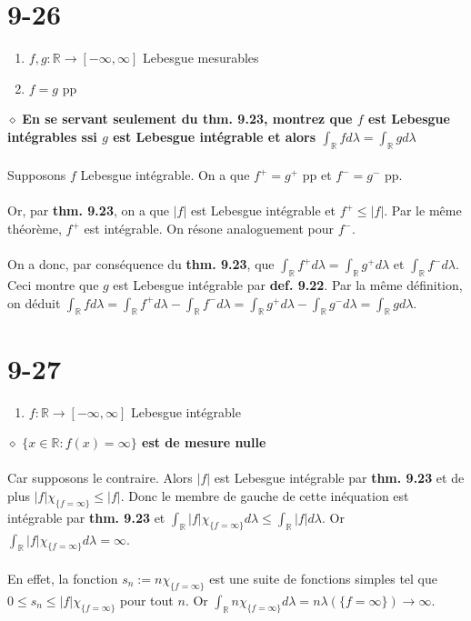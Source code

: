 \documentclass[a4paper,10pt]{article}
\begin{document}
\section*{9-26}
\begin{enumerate}
	\item $f,g : \mathbb{R} \rightarrow [-\infty, \infty]$ Lebesgue mesurables
	\item $f = g$ pp
\end{enumerate}
$\diamond$ \textbf{En se servant seulement du thm. 9.23, montrez que $f$ est Lebesgue intégrables ssi $g$ est Lebesgue intégrable et alors $\int_\mathbb{R} f d\lambda = \int_\mathbb{R} g d\lambda$}
\\
\\
Supposons $f$ Lebesgue intégrable. On a que $f^+ = g^+$ pp et $f^- = g^-$ pp.
\\
\\
Or, par \textbf{thm. 9.23}, on a que $|f|$ est Lebesgue intégrable et $f^+ \leq |f|$. Par le même théorème, $f^+$ est intégrable. On résone analoguement pour $f^-$.
\\
\\
On a donc, par conséquence du \textbf{thm. 9.23}, que $\int_\mathbb{R} f^+ d\lambda = \int_\mathbb{R} g^+ d\lambda$ et $\int_\mathbb{R} f^- d\lambda$. Ceci montre que $g$ est Lebesgue intégrable par \textbf{def. 9.22}. Par la même définition, on déduit $\int_\mathbb{R} f d\lambda = \int_\mathbb{R} f^+ d\lambda - \int_\mathbb{R} f^- d\lambda = \int_\mathbb{R} g^+ d\lambda - \int_\mathbb{R} g^- d\lambda = \int_\mathbb{R} g d\lambda$.

\section*{9-27}
\begin{enumerate}
	\item $f : \mathbb{R} \rightarrow [-\infty, \infty]$ Lebesgue intégrable
\end{enumerate}
$\diamond$ \textbf{$\{x \in \mathbb{R} : f(x) = \infty\}$ est de mesure nulle}
\\
\\
Car supposons le contraire. Alors $|f|$ est Lebesgue intégrable par \textbf{thm. 9.23} et de plus $|f|\chi_{\{f = \infty\}} \leq |f|$. Donc le membre de gauche de cette inéquation est intégrable par \textbf{thm. 9.23} et $\int_\mathbb{R} |f|\chi_{\{f = \infty\}} d\lambda \leq \int_\mathbb{R} |f| d\lambda$. Or $\int_\mathbb{R} |f| \chi_{\{f = \infty\}} d\lambda = \infty$.
\\
\\
En effet, la fonction $s_n := n \chi_{\{f = \infty\}}$ est une suite de fonctions simples tel que $0 \leq s_n \leq |f|\chi_{\{f = \infty\}}$ pour tout $n$. Or $\int_\mathbb{R} n \chi_{\{f = \infty\}} d\lambda = n \lambda(\{f = \infty\}) \rightarrow \infty$. 
\end{document}
